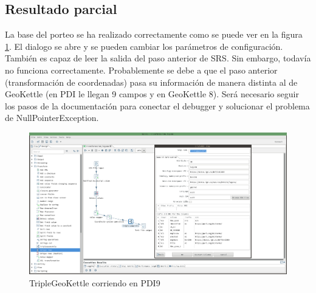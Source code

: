 \subsection{Resultado parcial}

La base del porteo se ha realizado correctamente como se puede ver en la figura \ref{fig:TGK-portado}. El dialogo
se abre y se pueden cambiar los parámetros de configuración. También es capaz de leer la salida del paso anterior
de SRS. Sin embargo, todavía no funciona correctamente. Probablemente se debe a que el paso
anterior (transformación de coordenadas) pasa su información de manera distinta al de GeoKettle (en PDI le llegan
9 campos y en GeoKettle 8). Será necesario seguir los pasos de la documentación para conectar el debugger y solucionar el
problema de NullPointerException.

\begin{figure}[H]
    \includegraphics[width=\textwidth]{images/TGK-portado.png}
    \centering
    \caption{TripleGeoKettle corriendo en PDI9}
    \label{fig:TGK-portado}
\end{figure}

